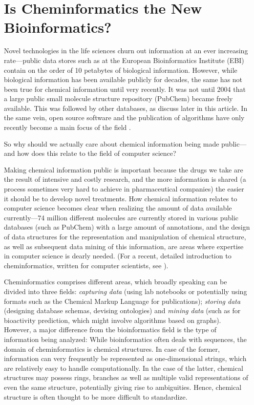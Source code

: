 \documentclass{sig-alternate}
\begin{document}
\section{Is Cheminformatics the New Bioinformatics?}

Novel technologies in the life sciences churn out information at an ever
increasing rate---public data stores such as at the European Bioinformatics
Institute (EBI) contain on the order of 10 petabytes of biological information.
However, while biological information has been available publicly for decades,
the same has not been true for chemical information until very recently. It was
not until 2004 that a large public small molecule structure repository (PubChem)
became freely available. This was followed by other databases, as discuss later
in this article. In the same vein, open source software and the publication of
algorithms have only recently become a main focus of the field
\cite{faulon2010}.

So why should we actually care about chemical information being made
public---and how does this relate to the field of computer science?

Making chemical information public is important because the drugs we
take are the result of intensive and costly research, and the more
information is shared (a process sometimes very hard to achieve in
pharmaceutical companies) the easier it should be to develop novel
treatments. How chemical information relates to computer science
becomes clear when realizing the amount of data available
currently---74 million different molecules are currently stored in
various public databases (such as PubChem) with a large amount of
annotations, and the design of data structures for the representation
and manipulation of chemical structure, as well as subsequent data
mining of this information, are areas where expertise in computer
science is dearly needed. (For a recent, detailed introduction to
cheminformatics, written for computer scientists, see
\cite{brown2009}).

Cheminformatics comprises different areas, which broadly speaking can be divided
into three fields: \emph{capturing data} (using lab notebooks or potentially using
formats such as the Chemical Markup Language for publications); \emph{storing data}
(designing database schemas, devising ontologies) and \emph{mining data} (such as for
bioactivity prediction, which might involve algorithms based on graphs).
However, a major difference from the bioinformatics field is the type of
information being analyzed: While bioinformatics often deals with sequences, the
domain of cheminformatics is chemical structures. In case of the former,
information can very frequently be represented as one-dimensional strings, which
are relatively easy to handle computationally. In the case of the latter, chemical
structures may possess rings, branches as well as multiple valid representations
of even the same structure, potentially giving rise to ambiguities. Hence,
chemical structure is often thought to be more difficult to standardize. 
\end{document}
